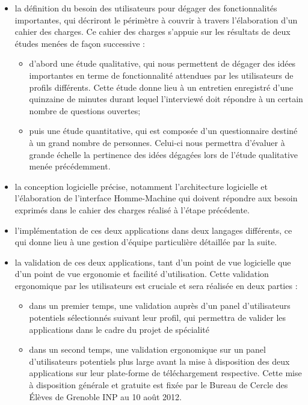 \documentclass[a4paper,11px]{article}
\begin{document}
\begin{itemize}
 	\item[\textbullet] la définition du besoin des utilisateurs pour dégager des fonctionnalités importantes, qui décriront le périmètre à couvrir à travers l'élaboration d'un cahier des charges. Ce cahier des charges s'appuie sur les résultats de deux études menées de façon successive : 
	\begin{itemize}
		\item d'abord une étude qualitative, qui nous permettent de dégager des idées importantes en terme de fonctionnalité attendues par les utilisateurs de profils différents. Cette étude donne lieu à un entretien enregistré d'une quinzaine de minutes durant lequel l'interviewé doit répondre à un certain nombre de questions ouvertes;
		\item puis une étude quantitative, qui est composée d'un questionnaire destiné à un grand nombre de personnes. Celui-ci nous permettra d'évaluer à grande échelle la pertinence des idées dégagées lors de l'étude qualitative menée précédemment.
	\end{itemize}
	\item[\textbullet] la conception logicielle précise, notamment l'architecture logicielle et l'élaboration de l'interface Homme-Machine qui doivent répondre aux besoin exprimés dans le cahier des charges réalisé à l'étape précédente.
	\item[\textbullet] l'implémentation de ces deux applications dans deux langages différents, ce qui donne lieu à une gestion d'équipe particulière détaillée par la suite.
	\item[\textbullet] la validation de ces deux applications, tant d'un point de vue logicielle que d'un point de vue ergonomie et facilité d'utilisation. Cette validation ergonomique par les utilisateurs est cruciale et sera réalisée en deux parties :
	\begin{itemize}
		\item dans un premier temps, une validation auprès d'un panel d'utilisateurs potentiels sélectionnés suivant leur profil, qui permettra de valider les applications dans le cadre du projet de spécialité
		\item dans un second temps, une validation ergonomique sur un panel d'utilisateurs potentiels plus large avant la mise à disposition des deux applications sur leur plate-forme de téléchargement respective. Cette mise à disposition générale et gratuite est fixée par le Bureau de Cercle des \'Elèves de Grenoble INP au 10 août 2012.
\\
\\
\\
	\end{itemize}
\end{itemize}
\end{document}
